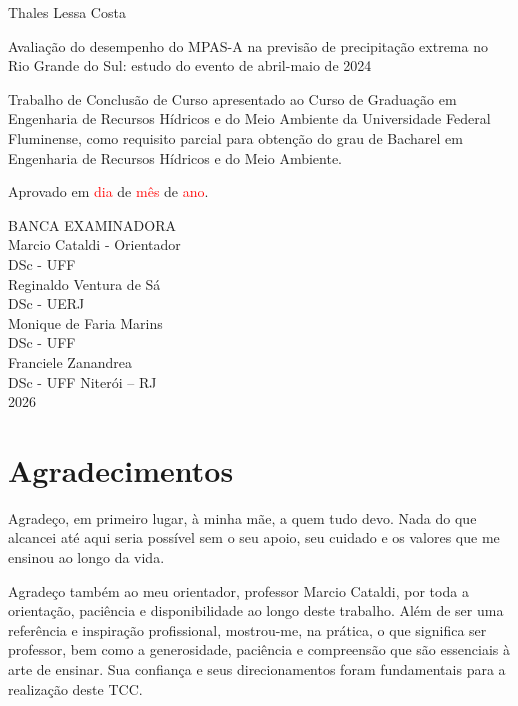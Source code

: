 \documentclass[12pt,a4paper,oneside]{book}
\begin{document}
\begin{center}
Thales Lessa Costa

\vspace{1cm}
Avaliação do desempenho do MPAS-A na previsão de precipitação extrema no Rio Grande do Sul: estudo do evento de abril-maio de 2024

\vspace{1cm}
\begin{flushright}
\begin{minipage}{0.55\textwidth}
Trabalho de Conclusão de Curso apresentado ao Curso de Graduação em Engenharia de Recursos Hídricos e do Meio Ambiente da Universidade Federal Fluminense, como requisito parcial para obtenção do grau de Bacharel em Engenharia de Recursos Hídricos e do Meio Ambiente.
\end{minipage}
\end{flushright}

\vfill
\begin{flushleft}
Aprovado em \textcolor{red}{dia} de \textcolor{red}{mês} de \textcolor{red}{ano}.
\end{flushleft}
\vfill
BANCA EXAMINADORA
\vfill
\hrulefill\\
Marcio Cataldi - Orientador\\
DSc - UFF
\vfill
\hrulefill\\
Reginaldo Ventura de Sá\\
DSc - UERJ
\vfill
\hrulefill\\
Monique de Faria Marins\\
DSc - UFF
\vfill
\hrulefill\\
Franciele Zanandrea\\
DSc - UFF
\vfill
Niterói -- RJ\\
2026
\end{center}
\clearpage

\chapter*{Agradecimentos}
Agradeço, em primeiro lugar, à minha mãe, a quem tudo devo. Nada do que alcancei até aqui seria possível sem o seu apoio, seu cuidado e os valores que me ensinou ao longo da vida.

Agradeço também ao meu orientador, professor Marcio Cataldi, por toda a orientação, paciência e disponibilidade ao longo deste trabalho. Além de ser uma referência e inspiração profissional, mostrou-me, na prática, o que significa ser professor, bem como a generosidade, paciência e compreensão que são essenciais à arte de ensinar. Sua confiança e seus direcionamentos foram fundamentais para a realização deste TCC.
\end{document}
